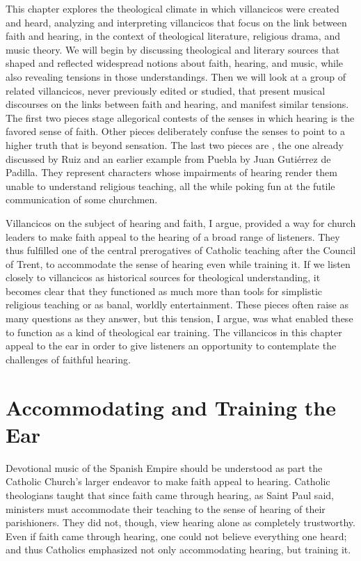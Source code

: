 This chapter explores the theological climate in which villancicos were created
and heard, analyzing and interpreting villancicos that focus on the link between
faith and hearing, in the context of theological literature, religious drama,
and music theory.
We will begin by discussing theological and literary sources that shaped and
reflected widespread notions about faith, hearing, and music, while also
revealing tensions in those understandings.
Then we will look at a group of related villancicos, never previously edited or
studied, that present musical discourses on the links between faith and hearing,
and manifest similar tensions.
The first two pieces stage allegorical contests of the senses in which hearing
is the favored sense of faith.
Other pieces deliberately confuse the senses to point to a higher truth that is
beyond sensation.
The last two pieces are , the one already
discussed by Ruiz and an earlier example from Puebla by Juan Gutiérrez de
Padilla.
They represent characters whose impairments of hearing render them unable to
understand religious teaching, all the while poking fun at the futile
communication of some churchmen.

Villancicos on the subject of hearing and faith, I argue, provided a way for
church leaders to make faith appeal to the hearing of a broad range of
listeners.
They thus fulfilled one of the central prerogatives of Catholic teaching after
the Council of Trent, to accommodate the sense of hearing even while training
it.
If we listen closely to villancicos as historical sources for theological
understanding, it becomes clear that they functioned as much more than tools for
simplistic religious teaching or as banal, worldly entertainment.
These pieces often raise as many questions as they answer, but this tension, I
argue, was what enabled these to function as a kind of theological ear training.
The villancicos in this chapter appeal to the ear in order to give listeners an
opportunity to contemplate the challenges of faithful hearing.

\section{Accommodating and Training the Ear}

Devotional music of the Spanish Empire should be understood as part the Catholic
Church's larger endeavor to make faith appeal to hearing.
Catholic theologians taught that since faith came through hearing, as Saint Paul
said, ministers must accommodate their teaching to the sense of hearing of their
parishioners.
They did not, though, view hearing alone as completely trustworthy.
Even if faith came through hearing, one could not believe everything one heard;
and thus Catholics emphasized not only accommodating hearing, but training it.

